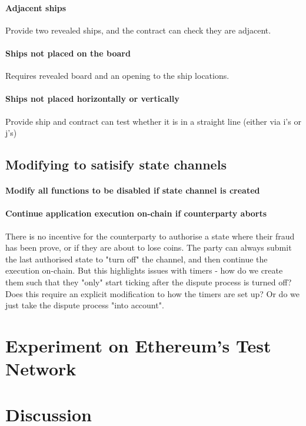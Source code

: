 \documentclass{llncs}
\begin{document}
\paragraph{Adjacent ships} 
Provide two revealed ships, and the contract can check they are adjacent. 

\paragraph{Ships not placed on the board}
Requires revealed board and an opening to the ship locations. 

\paragraph{Ships not placed horizontally or vertically} 
Provide ship and contract can test whether it is in a straight line (either via i's or j's)

\subsection{Modifying to satisify state channels}

\paragraph{Modify all functions to be disabled if state channel is created}

\paragraph{Continue application execution on-chain if counterparty aborts}
There is no incentive for the counterparty to authorise a state where their fraud has been prove, or if they are about to lose coins. The party can always submit the last authorised state to "turn off" the channel, and then continue the execution on-chain. But this highlights issues with timers - how do we create them such that they "only" start ticking after the dispute process is turned off? Does this require an explicit modification to how the timers are set up? Or do we just take the dispute process "into account". 

\section{Experiment on Ethereum's Test Network}

\section{Discussion} 
\end{document}
